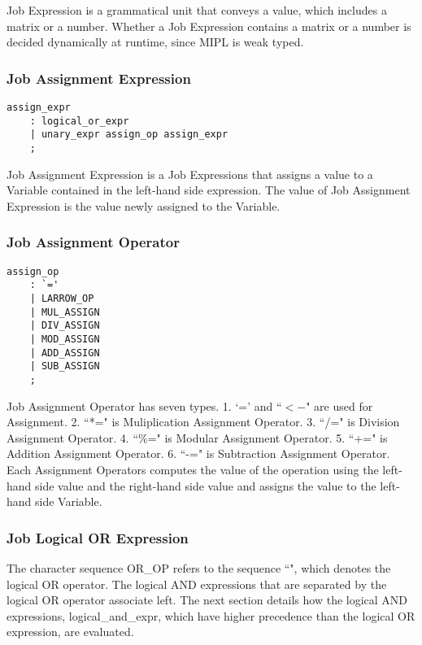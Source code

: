 \documentclass[prodmode,acmtecs]{acmsmall}
\begin{document}
Job Expression is a grammatical unit that conveys a value, which
includes a matrix or a number.  Whether a Job Expression contains
a matrix or a number is decided dynamically at runtime, since MIPL
is weak typed.


\subsubsection{Job Assignment Expression}

\begin{lstlisting}
assign_expr
	: logical_or_expr
	| unary_expr assign_op assign_expr
	;
\end{lstlisting}

\label{Assignment_Expression_Section}
Job Assignment Expression is a Job Expressions that assigns a value
to a Variable contained in the left-hand side expression.  The value
of Job Assignment Expression is the value newly assigned to the
Variable.


\subsubsection{Job Assignment Operator}

\begin{lstlisting}
assign_op
	: `='
	| LARROW_OP
	| MUL_ASSIGN
	| DIV_ASSIGN
	| MOD_ASSIGN
	| ADD_ASSIGN
	| SUB_ASSIGN
	;
\end{lstlisting}

Job Assignment Operator has seven types.  1. `=' and ``$<-$" are used
for Assignment.  2. ``*=" is Muliplication Assignment Operator.  3. 
``/=" is Division Assignment Operator.  4. ``\%=" is Modular Assignment
Operator.  5. ``+=" is Addition Assignment Operator.  6. ``-=" is
Subtraction Assignment Operator.  Each Assignment Operators computes
the value of the operation using the left-hand side value and the
right-hand side value and assigns the value to the left-hand side
Variable.



\subsubsection{Job Logical OR Expression}

The character sequence OR\_OP refers to the sequence ``\textbardbl", which  
denotes the logical OR operator. The logical AND expressions that are 
separated by the logical OR operator associate left. The next section 
details how the logical AND expressions, logical\_and\_expr, which have 
higher precedence than the logical OR expression, are evaluated. 
\end{document}
